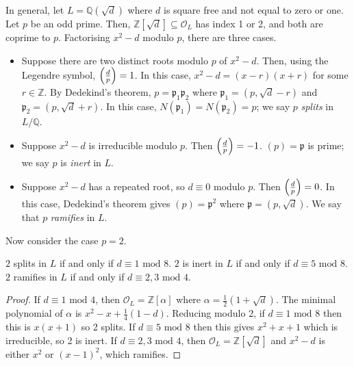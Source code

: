 \begin{example}
    In general, let \( L = \mathbb Q(\sqrt{d}) \) where \( d \) is square free and not equal to zero or one.
    Let \( p \) be an odd prime.
    Then, \( \mathbb Z[\sqrt{d}] \subseteq \mathcal O_L \) has index 1 or 2, and both are coprime to \( p \).
    Factorising \( x^2 - d \) modulo \( p \), there are three cases.
    \begin{itemize}
        \item Suppose there are two distinct roots modulo \( p \) of \( x^2 - d \).
        Then, using the Legendre symbol, \( \qty(\frac{d}{p}) = 1 \).
        In this case, \( x^2 - d = (x-r)(x+r) \) for some \( r \in \mathbb Z \).
        By Dedekind's theorem, \( p = \mathfrak p_1 \mathfrak p_2 \) where \( \mathfrak p_1 = (p, \sqrt{d} - r) \) and \( \mathfrak p_2 = (p, \sqrt{d} + r) \).
        In this case, \( N(\mathfrak p_1) = N(\mathfrak p_2) = p \); we say \( p \) \emph{splits} in \( L/\mathbb Q \).
        \item Suppose \( x^2 - d \) is irreducible modulo \( p \).
        Then \( \qty(\frac{d}{p}) = -1 \).
        \( (p) = \mathfrak p \) is prime; we say \( p \) is \emph{inert} in \( L \).
        \item Suppose \( x^2 - d \) has a repeated root, so \( d \equiv 0 \) modulo \( p \).
        Then \( \qty(\frac{d}{p}) = 0 \).
        In this case, Dedekind's theorem gives \( (p) = \mathfrak p^2 \) where \( \mathfrak p = (p, \sqrt{d}) \).
        We say that \( p \) \emph{ramifies} in \( L \).
    \end{itemize}
\end{example}
Now consider the case \( p = 2 \).
\begin{lemma}
    \( 2 \) splits in \( L \) if and only if \( d \equiv 1 \text{ mod } 8 \).
    \( 2 \) is inert in \( L \) if and only if \( d \equiv 5 \text{ mod } 8 \).
    \( 2 \) ramifies in \( L \) if and only if \( d \equiv 2, 3 \text{ mod } 4 \).
\end{lemma}
\begin{proof}
    If \( d \equiv 1 \text{ mod } 4 \), then \( \mathcal O_L = \mathbb Z[\alpha] \) where \( \alpha = \frac{1}{2}(1+\sqrt{d}) \).
    The minimal polynomial of \( \alpha \) is \( x^2 - x + \frac{1}{4}(1-d) \).
    Reducing modulo 2, if \( d \equiv 1 \text{ mod } 8 \) then this is \( x(x+1) \) so 2 splits.
    If \( d \equiv 5 \text{ mod } 8 \) then this gives \( x^2+x+1 \) which is irreducible, so 2 is inert.
    If \( d \equiv 2, 3 \text{ mod } 4 \), then \( \mathcal O_L = \mathbb Z[\sqrt{d}] \) and \( x^2 - d \) is either \( x^2 \) or \( (x-1)^2 \), which ramifies.
\end{proof}
